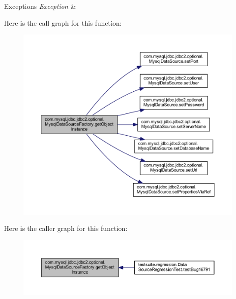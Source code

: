 \begin{DoxyExceptions}{Exceptions}
{\em Exception} & \\
\hline
\end{DoxyExceptions}
Here is the call graph for this function\+:
\nopagebreak
\begin{figure}[H]
\begin{center}
\leavevmode
\includegraphics[width=350pt]{classcom_1_1mysql_1_1jdbc_1_1jdbc2_1_1optional_1_1_mysql_data_source_factory_a0cfa2574e8030765a671f4591628ce10_cgraph}
\end{center}
\end{figure}
Here is the caller graph for this function\+:
\nopagebreak
\begin{figure}[H]
\begin{center}
\leavevmode
\includegraphics[width=350pt]{classcom_1_1mysql_1_1jdbc_1_1jdbc2_1_1optional_1_1_mysql_data_source_factory_a0cfa2574e8030765a671f4591628ce10_icgraph}
\end{center}
\end{figure}


